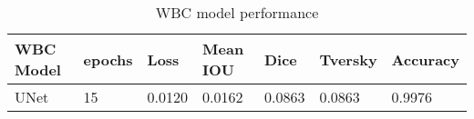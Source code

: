 \begin{table}[H]
\begin{tabular}{|l|l|l|l|l|l|l|}
\hline
\textbf{WBC Model} & \textbf{epochs} & \textbf{Loss}   &\textbf{Mean IOU} & \textbf{Dice}   & \textbf{Tversky} & \textbf{Accuracy} \\ \hline
UNet      & 15 & 0.0120 & 0.0162   & 0.0863 & 0.0863  & 0.9976   \\ \hline
\end{tabular}
\caption{WBC model performance}
\label{table:unet-wbc-training}
\end{table}